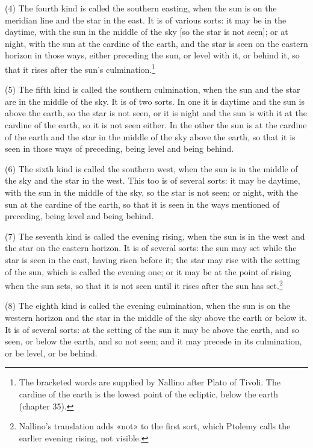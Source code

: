 \documentclass[11pt]{article}
\begin{document}
\par (4) The fourth kind is called the southern easting, when the sun is on the meridian line and the star in the east. It is of various sorts: it may be in the daytime, with the sun in the middle of the sky [so the star is not seen]; or at night, with the sun at the cardine of the earth, and the star is seen on the eastern horizon in those ways, either preceding the sun, or level with it, or behind it, so that it rises after the sun's culmination.\footnote{The bracketed words are supplied by Nallino after Plato of Tivoli. The cardine of the earth is the lowest point of the ecliptic, below the earth (chapter 35).}\par
\par (5) The fifth kind is called the southern culmination, when the sun and the star are in the middle of the sky. It is of two sorts. In one it is daytime and the sun is above the earth, so the star is not seen, or it is night and the sun is with it at the cardine of the earth, so it is not seen either. In the other the sun is at the cardine of the earth and the star in the middle of the sky above the earth, so that it is seen in those ways of preceding, being level and being behind.\par
\par (6) The sixth kind is called the southern west, when the sun is in the middle of the sky and the star in the west. This too is of several sorts: it may be daytime, with the sun in the middle of the sky, so the star is not seen; or night, with the sun at the cardine of the earth, so that it is seen in the ways mentioned of preceding, being level and being behind.\par
\par (7) The seventh kind is called the evening rising, when the sun is in the west and the star on the eastern horizon. It is of several sorts: the sun may set while the star is seen in the east, having risen before it; the star may rise with the setting of the sun, which is called the evening one; or it may be at the point of rising when the sun sets, so that it is not seen until it rises after the sun has set.\footnote{Nallino's translation adds «not» to the first sort, which Ptolemy calls the earlier evening rising, not visible.}\par
\par (8) The eighth kind is called the evening culmination, when the sun is on the western horizon and the star in the middle of the sky above the earth or below it. It is of several sorts: at the setting of the sun it may be above the earth, and so seen, or below the earth, and so not seen; and it may precede in its culmination, or be level, or be behind.\par
\end{document}
